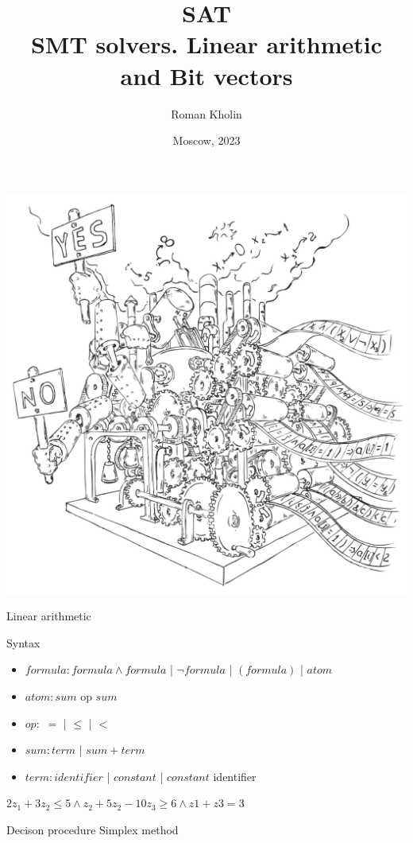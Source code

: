 \documentclass{beamer}
\begin{document}
\title{SAT\\SMT solvers. Linear arithmetic and Bit vectors}
\author{Roman Kholin}
\date{Moscow, 2023}

\begin{frame}
\includegraphics[scale=0.5]{../decision-procedure.png}
\end{frame}

\frame{\titlepage}

\begin{frame}{Linear arithmetic}
\begin{block}{Syntax}
\begin{itemize}
\item $formula: formula \wedge formula$ | $\lnot formula$ | $(formula)$ | $atom$
\item $atom : sum$ op $sum$
\item $op :$ $=$ | $\le$ | $<$
\item $sum : term$ | $sum + term$
\item $term : identifier$ | $constant$ | $constant$ identifier
\end{itemize}
$2z_1 + 3z_2 \le 5 \wedge z_2 + 5z_2 - 10z_3 \ge 6 \wedge z1 + z3 = 3$
\end{block}
\begin{block}{Decison procedure}
Simplex method
\end{block}
\end{frame}
\end{document}
